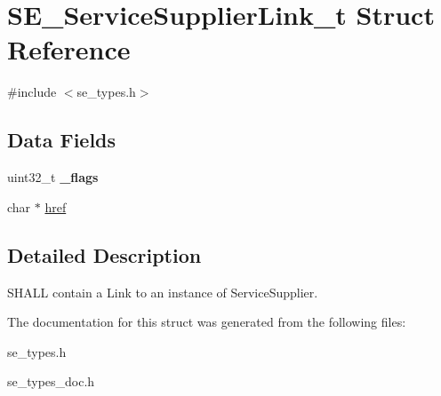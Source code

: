 \hypertarget{structSE__ServiceSupplierLink__t}{}\section{S\+E\+\_\+\+Service\+Supplier\+Link\+\_\+t Struct Reference}
\label{structSE__ServiceSupplierLink__t}


{\ttfamily \#include $<$se\+\_\+types.\+h$>$}

\subsection*{Data Fields}
\begin{DoxyCompactItemize}
\item 
uint32\+\_\+t {\bfseries \+\_\+flags}
\item 
char $\ast$ \hyperlink{group__ServiceSupplierLink_ga528fc874ceb80ade0f0281a159f5a6d5}{href}
\end{DoxyCompactItemize}


\subsection{Detailed Description}
S\+H\+A\+LL contain a Link to an instance of Service\+Supplier. 

The documentation for this struct was generated from the following files\+:\begin{DoxyCompactItemize}
\item 
se\+\_\+types.\+h\item 
se\+\_\+types\+\_\+doc.\+h\end{DoxyCompactItemize}
